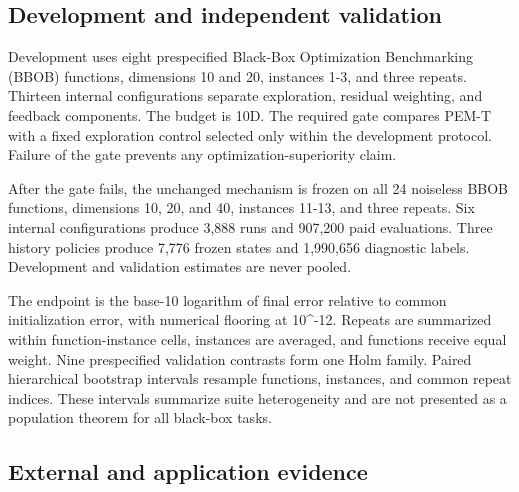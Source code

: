 \documentclass[]{interact}
\begin{document}
\hypertarget{development-and-independent-validation}{%
\subsection{Development and independent validation}\label{development-and-independent-validation}}

Development uses eight prespecified Black-Box Optimization Benchmarking (BBOB) functions, dimensions 10 and 20, instances 1-3, and three repeats. Thirteen internal configurations separate exploration, residual weighting, and feedback components. The budget is 10D. The required gate compares PEM-T with a fixed exploration control selected only within the development protocol. Failure of the gate prevents any optimization-superiority claim.

After the gate fails, the unchanged mechanism is frozen on all 24 noiseless BBOB functions, dimensions 10, 20, and 40, instances 11-13, and three repeats. Six internal configurations produce 3,888 runs and 907,200 paid evaluations. Three history policies produce 7,776 frozen states and 1,990,656 diagnostic labels. Development and validation estimates are never pooled.

The endpoint is the base-10 logarithm of final error relative to common initialization error, with numerical flooring at 10\^{}-12. Repeats are summarized within function-instance cells, instances are averaged, and functions receive equal weight. Nine prespecified validation contrasts form one Holm family. Paired hierarchical bootstrap intervals resample functions, instances, and common repeat indices. These intervals summarize suite heterogeneity and are not presented as a population theorem for all black-box tasks.

\hypertarget{external-and-application-evidence}{%
\subsection{External and application evidence}\label{external-and-application-evidence}}
\end{document}
